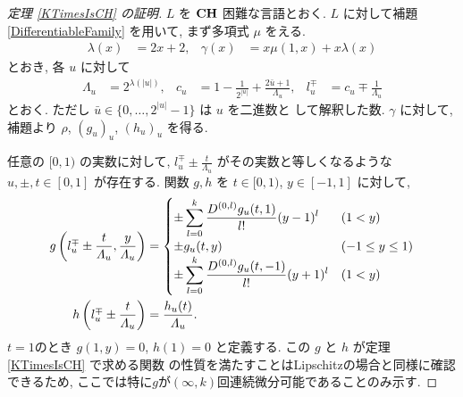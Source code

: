 \begin{proof}[\rm 定理 \ref{KTimesIsCH} の証明]
 $L$ を $\mathbf{CH}$ 困難な言語とおく.
 $L$ に対して補題 \ref{DifferentiableFamily} を用いて,
 まず多項式 $\mu$ をえる.
 \begin{align}
  \lambda(x) &= 2x + 2,&
  \gamma(x) &= x\mu(1, x) + x \lambda(x)
 \end{align}
 とおき, 各 $u$ に対して 
\begin{align}
 \Lambda_u 
 &= 2^{\lambda(|u|)}, &
 c_u 
 &= 1-\frac{1}{2^{|u|}}+\frac{2\bar{u}+1}{\Lambda_u}, &
 l_u^\mp 
 &= c_u\mp\frac{1}{\varLambda_u} 
\end{align}  
 とおく. ただし $\bar u \in \{0, \dots, 2^{|u|} - 1\}$ は $u$ を二進数と
 して解釈した数.
 $\gamma$ に対して, 補題より $\rho$, $(g_u)_u$, $(h_u)_u$ を得る.


 任意の $[0,1)$ の実数に対して,
 $l^\mp_u \pm \frac{t}{\Lambda_u}$ がその実数と等しくなるような
 $u, \pm, t\in [0,1]$ が存在する.
 関数 $g, h$ を $t \in [0,1)$, $y \in [-1, 1]$ に対して,
 \begin{align}
 g \left(l^\mp_u \pm \frac{t}{\varLambda_u}, \frac{y}{\varLambda_u}\right)
  &= \begin{cases}
      \pm \displaystyle \sum_{l=0}^k \frac{D^{(0,l)}g_u(t,1)}{l!} (y-1)^l 
      &  (1<y) \\
      \pm g_u(t, y)      & (-1 \le y \le 1) \\
      \pm \displaystyle \sum_{l=0}^k \frac{D^{(0,l)}g_u(t,-1)}{l!} (y+1)^l  
      &  (1<y) \\
    \end{cases} 
  \\
 h \left( l^\mp_u \pm \frac{t}{\varLambda_u} \right) 
  & = \frac{h_u(t)}{\varLambda_u}.
\end{align}
 $t=1$のとき $g(1,y) = 0$, $h(1) = 0$ と定義する.
 この $g$ と $h$ が定理 \ref{KTimesIsCH} で求める関数
 の性質を満たすことはLipschitzの場合と同様に確認できるため,
 ここでは特に$g$が$(\infty, k)$回連続微分可能であることのみ示す.


\end{proof}
